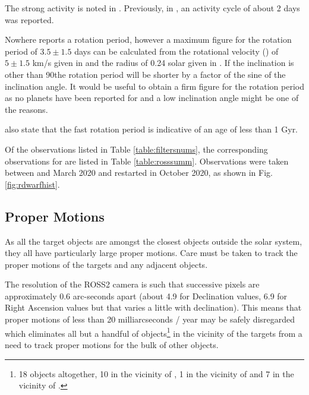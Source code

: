 The strong activity is noted in \citet{wargelin08}. Previously, in
\citet{jarrett76}, an activity cycle of about 2 days was reported.

Nowhere reports a rotation period, however a maximum figure for the rotation
period of $3.5 \pm 1.5$ days can be calculated from the rotational
velocity (\vsini) of $5 \pm 1.5$ km/s given in \citet{wargelin08} and the radius of 0.24 solar given in
\citet{johnson83}. If the inclination is other than 90\degree the rotation
period will be shorter by a factor of the sine of the inclination angle.
It would be useful to obtain a firm figure for the rotation period as no planets
have been reported for {\ross} and a low inclination angle might be one of the
reasons.

\citet{wargelin08} also state that the fast rotation period is indicative of an age of less than 1 Gyr.

Of the observations
listed in Table \ref{table:filtersnums}, the corresponding observations for
{\ross} are listed in Table \ref{table:rosssumm}.
Observations were taken between  and March 2020 and
restarted in October 2020, as shown in Fig.
\ref{fig:rdwarfhist}.


\engdate
\subsection{Proper Motions}
\protect\label{section:propermotions}
As all the target objects are amongst the closest objects outside the solar
system, they all have particularly large proper motions. Care must be taken to
track the proper motions of the targets and any adjacent objects.

The resolution of the ROSS2 camera is such that successive pixels
are approximately 0.6 arc-seconds apart (about 4.9 for Declination values, 6.9
for Right Ascension values but that varies a little with declination). This
means that proper motions of less than 20 milliarcseconds / year may be safely
disregarded which eliminates all but a handful of objects\footnote{18 objects
altogether, 10 in the vicinity of \prox, 1 in the vicinity of {\bstar} and 7 in
the vicinity of \ross.} in the vicinity of the targets from a need to track proper
motions for the bulk of other objects.

